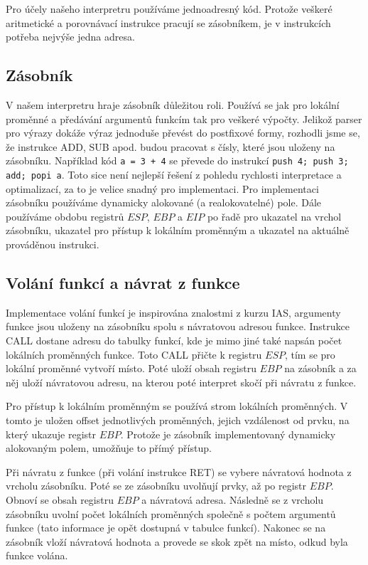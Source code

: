 \documentclass[a4paper,11pt,titlepage]{article}
\begin{document}
Pro účely našeho interpretru používáme jednoadresný kód. Pro\-to\-že veškeré aritmetické a porovnávací instrukce pracují se zásobníkem, je v instrukcích potřeba nejvýše jedna adresa.

\subsection{Zásobník}

V našem interpretru hraje zásobník důležitou roli. Používá se jak pro lokální proměnné a předávání argumentů funkcím tak pro veškeré výpočty. Jelikož parser pro výrazy dokáže výraz jednoduše převést do postfixové formy, rozhodli jsme se, že instrukce ADD, SUB apod. budou pracovat s čísly, které jsou uloženy na zásobníku. Například kód {\tt a = 3 + 4} se převede do instrukcí {\tt push 4; push 3; add; popi a}. Toto sice není nejlepší řešení z pohledu rychlosti interpretace a optimalizací, za to je velice snadný pro implementaci. Pro implementaci zásobníku používáme dynamicky alokované (a realokovatelné) pole. Dále používáme obdobu registrů $ESP$, $EBP$ a $EIP$ po řadě pro ukazatel na vrchol zásobníku, ukazatel pro přístup k lokálním proměnným a ukazatel na aktuálně prováděnou instrukci.

\subsection{Volání funkcí a návrat z funkce}

Implementace volání funkcí je inspirována znalostmi z kurzu IAS, argumenty funkce jsou uloženy na zásobníku spolu s návratovou adresou funkce. Instrukce CALL dostane adresu do tabulky funkcí, kde je mimo jiné také napsán počet lokálních pro\-měn\-ných funkce. Toto CALL přičte k registru $ESP$, tím se pro lokální proměnné vytvoří místo. Poté uloží obsah registru $EBP$ na zásobník a za něj uloží návratovou adresu, na kterou poté interpret skočí při návratu z funkce.


Pro přístup k lokálním proměnným se používá strom lokálních pro\-měn\-ných. V tomto je uložen offset jednotlivých proměnných, jejich vzdálenost od prvku, na který ukazuje registr $EBP$. Protože je zásobník implementovaný dynamicky alokovaným polem, umožňuje to přímý přístup.


Při návratu z funkce (při volání instrukce RET) se vybere návratová hodnota z vrcholu zásobníku. Poté se ze zásobníku uvolňují prvky, až po registr $EBP$. Obnoví se obsah registru $EBP$ a návratová adresa. Následně se z vrcholu zásobníku uvolní počet lokálních proměnných společně s počtem argumentů funkce (tato informace je opět dostupná v tabulce funkcí). Nakonec se na zásobník vloží návratová hodnota a provede se skok zpět na místo, odkud byla funkce volána.
\end{document}
